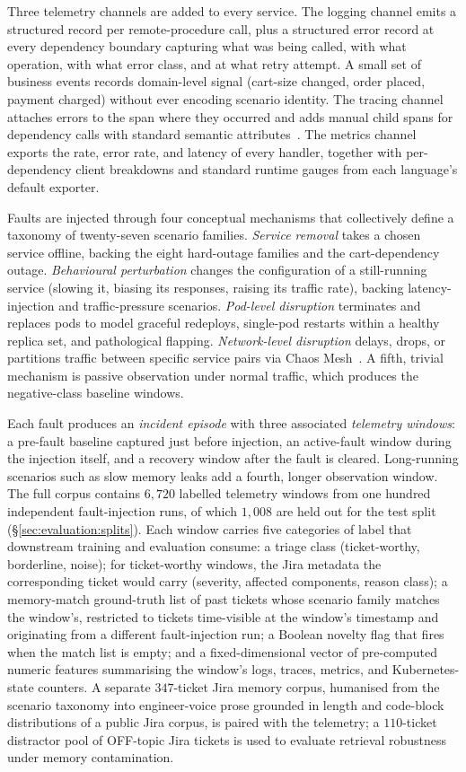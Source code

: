 Three telemetry channels are added to every service. The logging channel emits a structured record per remote-procedure call, plus a structured error record at every dependency boundary capturing what was being called, with what operation, with what error class, and at what retry attempt. A small set of business events records domain-level signal (cart-size changed, order placed, payment charged) without ever encoding scenario identity. The tracing channel attaches errors to the span where they occurred and adds manual child spans for dependency calls with standard semantic attributes~\cite{otel-spec}. The metrics channel exports the rate, error rate, and latency of every handler, together with per-dependency client breakdowns and standard runtime gauges from each language's default exporter.

Faults are injected through four conceptual mechanisms that collectively define a taxonomy of twenty-seven scenario families. \emph{Service removal} takes a chosen service offline, backing the eight hard-outage families and the cart-dependency outage. \emph{Behavioural perturbation} changes the configuration of a still-running service (slowing it, biasing its responses, raising its traffic rate), backing latency-injection and traffic-pressure scenarios. \emph{Pod-level disruption} terminates and replaces pods to model graceful redeploys, single-pod restarts within a healthy replica set, and pathological flapping. \emph{Network-level disruption} delays, drops, or partitions traffic between specific service pairs via Chaos Mesh~\cite{chaosmesh}. A fifth, trivial mechanism is passive observation under normal traffic, which produces the negative-class baseline windows.

Each fault produces an \emph{incident episode} with three associated \emph{telemetry windows}: a pre-fault baseline captured just before injection, an active-fault window during the injection itself, and a recovery window after the fault is cleared. Long-running scenarios such as slow memory leaks add a fourth, longer observation window. The full corpus contains $6{,}720$ labelled telemetry windows from one hundred independent fault-injection runs, of which $1{,}008$ are held out for the test split (\S\ref{sec:evaluation:splits}). Each window carries five categories of label that downstream training and evaluation consume: a triage class (ticket-worthy, borderline, noise); for ticket-worthy windows, the Jira metadata the corresponding ticket would carry (severity, affected components, reason class); a memory-match ground-truth list of past tickets whose scenario family matches the window's, restricted to tickets time-visible at the window's timestamp and originating from a different fault-injection run; a Boolean novelty flag that fires when the match list is empty; and a fixed-dimensional vector of pre-computed numeric features summarising the window's logs, traces, metrics, and Kubernetes-state counters. A separate $347$-ticket Jira memory corpus, humanised from the scenario taxonomy into engineer-voice prose grounded in length and code-block distributions of a public Jira corpus, is paired with the telemetry; a $110$-ticket distractor pool of OFF-topic Jira tickets is used to evaluate retrieval robustness under memory contamination.


